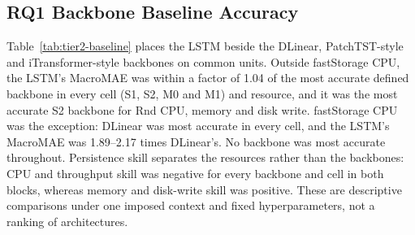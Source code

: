 \documentclass[5p,twocolumn]{elsarticle}
\begin{document}
\subsection{RQ1 Backbone Baseline Accuracy}
\label{sec:results-baselines}

Table~\ref{tab:tier2-baseline} places the LSTM beside the DLinear,
PatchTST-style and iTransformer-style backbones on common units. Outside
fastStorage CPU, the LSTM's MacroMAE was within a factor of 1.04 of the most
accurate defined backbone in every cell (S1, S2, M0 and M1) and resource, and
it was the most accurate S2 backbone for Rnd CPU, memory and disk write.
fastStorage CPU was the exception: DLinear was most accurate in every cell,
and the LSTM's MacroMAE was 1.89--2.17 times DLinear's. No backbone was most
accurate throughout. Persistence skill separates the resources rather than
the backbones: CPU and throughput skill was negative for every backbone and
cell in both blocks, whereas memory and disk-write skill was positive. These
are descriptive comparisons under one imposed context and fixed
hyperparameters, not a ranking of architectures.

\end{document}
